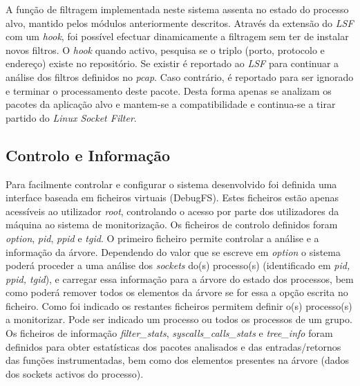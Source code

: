 \documentclass[a4paper]{llncs}
\begin{document}
A função de filtragem  implementada neste sistema assenta no estado do processo alvo, mantido pelos módulos anteriormente descritos.
 Através da extensão do \textit{LSF} com um \textit{hook}, foi possível efectuar dinamicamente a filtragem sem ter de instalar novos filtros.
 O \textit{hook} quando activo, pesquisa se o triplo (porto, protocolo e endereço) existe no repositório.
 Se existir é reportado ao \textit{LSF} para continuar a análise dos filtros definidos no \textit{pcap}.
 Caso contrário, é reportado para ser ignorado e terminar o processamento deste pacote.
 Desta forma apenas se analizam os pacotes da aplicação alvo e mantem-se a compatibilidade e continua-se a tirar partido do \textit{Linux Socket Filter}.



\subsection*{Controlo e Informação}
\label{sub:data_information}

Para facilmente controlar e configurar o sistema desenvolvido foi definida uma interface baseada em ficheiros virtuais (DebugFS).
 Estes ficheiros estão apenas acessíveis ao utilizador \textit{root}, controlando o acesso por parte dos utilizadores da máquina ao sistema de monitorização.
 Os ficheiros de controlo definidos foram \textit{option}, \textit{pid}, \textit{ppid} e \textit{tgid}.
 O primeiro ficheiro permite controlar a análise e a informação da árvore.
 Dependendo do valor que se escreve em \textit{option} o sistema poderá proceder a uma análise dos \textit{sockets} do(s) processo(s) (identificado em \textit{pid, ppid, tgid}), e carregar essa informação para a árvore do estado dos processos, bem como poderá remover todos os elementos da árvore se for essa a opção escrita no ficheiro.
 Como foi indicado os restantes ficheiros permitem definir o(s) processo(s) a monitorizar.
 Pode ser indicado um processo ou todos os processos de um grupo.
 Os ficheiros de informação \textit{filter\_stats}, \textit{syscalls\_calls\_stats} e \textit{tree\_info} foram definidos para obter estatísticas dos pacotes analisados e das entradas/retornos das funções instrumentadas, bem como dos elementos presentes na árvore (dados dos sockets activos do processo).
\end{document}
